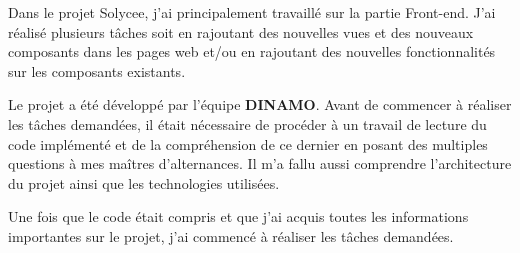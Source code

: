 \documentclass[12pt]{article}
\begin{document}
Dans le projet Solycee, j'ai principalement travaillé sur la partie Front-end. J'ai réalisé plusieurs tâches soit en rajoutant des nouvelles vues et des nouveaux composants dans les pages web et/ou en rajoutant des nouvelles fonctionnalités sur les composants existants.

Le projet a été développé par l'équipe \textbf{DINAMO}. Avant de commencer à réaliser les tâches demandées, il était nécessaire de procéder à un travail  de lecture du code implémenté et de la compréhension de ce dernier en posant des multiples questions à mes maîtres d'alternances. Il m'a fallu aussi comprendre l'architecture du projet ainsi que les technologies utilisées. 

Une fois que le code était compris et que j'ai acquis toutes les informations importantes sur le projet, j'ai commencé à réaliser les tâches demandées.
\end{document}
